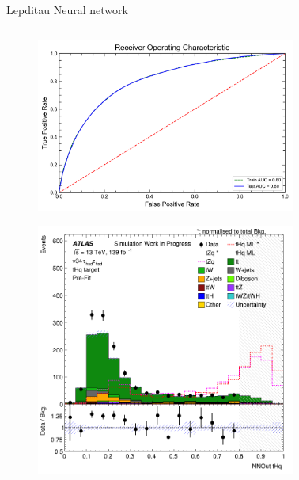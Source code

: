 \begin{frame}{Lepditau Neural network}
    \begin{columns}
        \begin{column}{0.5\textwidth}
            \begin{figure}
                \centering
                \includegraphics[width=0.8\textwidth]{hadhad_ROC}    
            \end{figure}
            \vspace{-0.35cm}
            \begin{figure}
                \centering
                \includegraphics[width=0.8\textwidth]{NNOut_hadhad}    
            \end{figure}
        \end{column}
        \begin{column}{0.5\textwidth}
            \vspace{-0.25cm}

\end{column}
\end{columns}
\end{frame}
